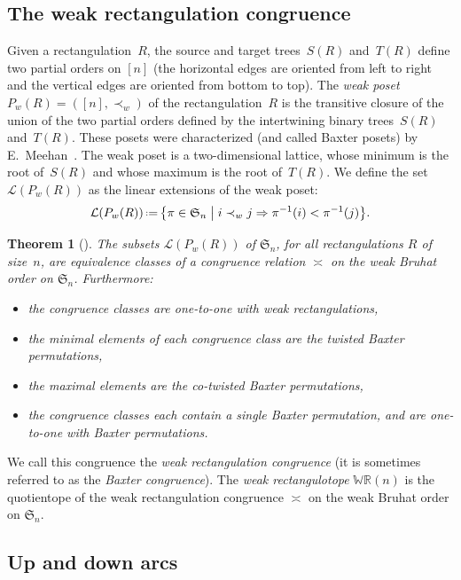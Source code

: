 \documentclass{amsart}
\newtheorem{theorem}{Theorem}%
\theoremstyle{definition}
\newcommand{\f}[1]{\mathfrak{#1}} %
\newcommand{\bigset}[2]{\big\{ #1 \;\big|\; #2 \big\}} %
\newcommand{\eqdef}{\mbox{\,\raisebox{0.2ex}{\scriptsize\ensuremath{\mathrm:}}\ensuremath{=}\,}} %
\renewcommand{\implies}{\Rightarrow} %
\newcommand{\darkblue}{\color{darkblue}} %
\newcommand{\defn}[1]{\textsl{\darkblue #1}} %
\newcommand{\polytope}[1]{\mathds{#1}} %
\newcommand{\WRP}{\polytope{WR}} %
\newcommand{\weakeq}{\asymp}
\begin{document}

\subsection{The weak rectangulation congruence}
\label{subsec:weakRectangulationCongruence}

Given a rectangulation~$R$, the source and target trees~$S(R)$ and~$T(R)$ define two partial orders on $[n]$ (the horizontal edges are oriented from left to right and the vertical edges are oriented from bottom to top).
The \defn{weak poset}~$P_w(R)=([n],\prec_w)$ of the rectangulation~$R$ is the transitive closure of the union of the two partial orders defined by the intertwining binary trees~$S(R)$ and~$T(R)$.
These posets were characterized (and called Baxter posets) by E.~Meehan~\cite{MR4014603}.
The weak poset is a two-dimensional lattice, whose minimum is the root of~$S(R)$ and whose maximum is the root of~$T(R)$.
We define the set~$\mathcal{L}(P_w(R))$ as the linear extensions of the weak poset:
\[
\mathcal{L}(P_w(R)) \eqdef \bigset{\pi\in\f{S}_n }{ i\prec_w j\implies \pi^{-1}(i) < \pi^{-1}(j)}.
\]

\begin{theorem}[\cite{MR2871762}]
  The subsets $\mathcal{L}(P_w(R))$ of $\f{S}_n$, for all rectangulations $R$ of size~$n$, 
  are equivalence classes of a congruence relation $\weakeq$ on the weak Bruhat order on $\f{S}_n$.
  Furthermore:
  \begin{itemize}
  \item the congruence classes are one-to-one with weak rectangulations,  
  \item the minimal elements of each congruence class are the twisted Baxter permutations,
  \item the maximal elements are the co-twisted Baxter permutations,
  \item the congruence classes each contain a single Baxter permutation, and are one-to-one with Baxter permutations.
  \end{itemize}
\end{theorem}

We call this congruence the \defn{weak rectangulation congruence} (it is sometimes referred to as the \defn{Baxter congruence}).
The \defn{weak rectangulotope} $\WRP(n)$ is the quotientope of the weak rectangulation congruence $
\weakeq$ on the weak Bruhat order on $\f{S}_n$.

\subsection{Up and down arcs}
\label{subsec:upDownArcs}
\end{document}
